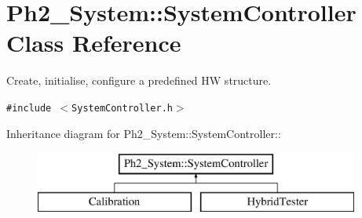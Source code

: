 \hypertarget{class_ph2___system_1_1_system_controller}{
\section{Ph2\_\-System::System\-Controller Class Reference}
\label{class_ph2___system_1_1_system_controller}
}
Create, initialise, configure a predefined HW structure.  


{\tt \#include $<$System\-Controller.h$>$}

Inheritance diagram for Ph2\_\-System::System\-Controller::\begin{figure}[H]
\begin{center}
\leavevmode
\includegraphics[height=2cm]{class_ph2___system_1_1_system_controller}
\end{center}
\end{figure}
